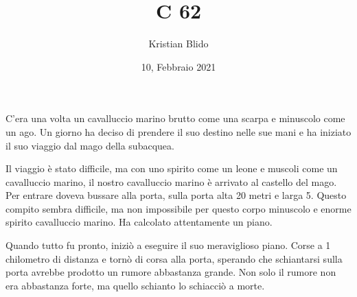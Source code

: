 \documentclass{article}
\begin{document}
\title{C 62}
\author{Kristian Blido}
\date{10, Febbraio 2021}
\maketitle
C'era una volta un cavalluccio marino brutto come una scarpa e minuscolo come un ago. Un giorno ha deciso di prendere il suo destino nelle sue mani e ha iniziato il suo viaggio dal mago della subacquea. 

Il viaggio è stato difficile, ma con uno spirito come un leone e muscoli come un cavalluccio marino, il nostro cavalluccio marino è arrivato al castello del mago. Per entrare doveva bussare alla porta, sulla porta alta 20 metri e larga 5. Questo compito sembra difficile, ma non impossibile per questo corpo minuscolo e enorme spirito cavalluccio marino. Ha calcolato attentamente un piano. 

Quando tutto fu pronto, iniziò a eseguire il suo meraviglioso piano. Corse a 1 chilometro di distanza e tornò di corsa alla porta, sperando che schiantarsi sulla porta avrebbe prodotto un rumore abbastanza grande. Non solo il rumore non era abbastanza forte, ma quello schianto lo schiacciò a morte.
\end{document}
